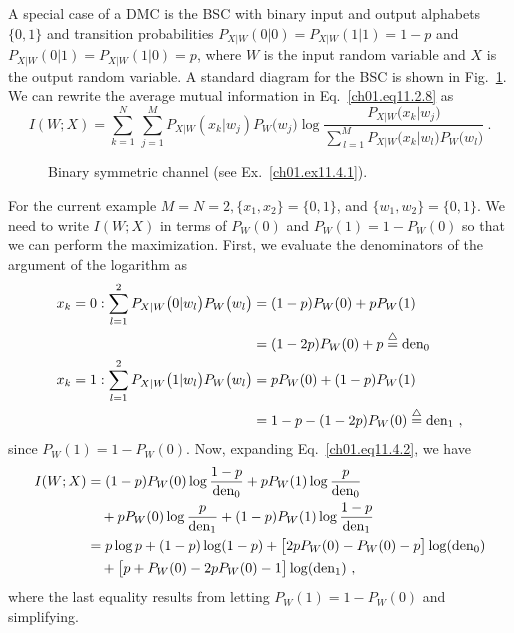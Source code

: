 \begin{example}
\label{ch01.ex11.4.1}
A special case of a DMC is the BSC with binary input and output alphabets
$\{ 0, 1 \} $ and transition probabilities
$ P_{X|W} (0|0) = P_{X|W} (1|1) = 1 -  p $
and
$ P_{X|W} (0|1) = P_{X|W} (1|0) =  p $, where $W$ is the input random variable
and
$X$ is the output random variable. A standard diagram for the BSC is shown
in Fig.~\ref{ch01.fig11.4.1}. We can rewrite the average mutual information
in Eq.~\eqref{ch01.eq11.2.8}
as
\begin{equation}
 \displaystyle
 I(W;X)  =  \sum^N_{k=1}\, \sum^M_{j=1} P_{X|W}
     \left(x_k|w_j \right) P_W \big(w_j\big)
 \log
 \frac{P_{X|W} \big(x_k|w_j\big)} {\sum\nolimits^M_{\,l=1}
  P_{X|W} \big(x_k|w_l\big) P_W \big(w_l\big) } ~.
\label{ch01.eq11.4.2}
\end{equation}

\begin{figure}[hbt] %
\figboxes
\caption{Binary symmetric channel
         (see Ex.~\protect\ref{ch01.ex11.4.1}).
\label{ch01.fig11.4.1} }
\end{figure}

For the current example $ M = N = 2,  \{ x_1, x_2 \} = \{ 0, 1 \} $, and
$ \{ w_1, w_2 \} = \{ 0, 1 \} $. We need to write $ I (W;X) $ in terms of
$ P_W (0) $ and $ P_W (1) = 1 -  P_W (0) $
so that we can perform the maximization. First, we evaluate the denominators
of the argument of the logarithm as
\begin{align*}
\displaystyle
 x_k = 0 : \sum^2_{l=1}
 P_{X|W} \big(0 | w_l\big) P_W \big(w_l\big)
 \displaystyle & = (1 - p) P_W (0) + p P_W (1)
 \\
 \displaystyle & = (1 - 2p) P_W (0)
 + p \stackrel{\triangle}{=} \text{den}_0
  \\
 x_k = 1 : \sum^2_{l=1}
 P_{X|W} \big(1 | w_l\big) P_W \big(w_l\big)
 \displaystyle & = p P_W (0) + (1 - p) P_W (1)
 \\
 \displaystyle &= 1 -p - (1- 2p) P_W (0)
 \stackrel{\triangle}{=} \text{den}_1   ~,
\end{align*}
since $P_W (1) = 1 - P_W (0) $. Now, expanding Eq.~\eqref{ch01.eq11.4.2},
we have
\begin{align}
 I(W;X) & = (1 - p) P_W (0)
 \log \frac{1-p}{\text{den}_0} + p P_W (1) \log \frac{p}{\text{den}_0}
 \notag\\
 & \quad {} +
 p P_W (0) \log \frac{p}{\text{den}_1} +
 (1 - p)
 P_W (1)
 \log \frac{ 1- p } {\text{den}_1}
 \notag\\
 & = p \log p + (1-p) \log (1 - p) + \big[2p P_W (0) - P_W (0) -p \big]
 \log (\text{den}_0)
 \notag\\
 & \quad {} + \big[p + P_W (0) - 2p P_W (0) - 1 \big]
 \log (\text{den}_1) ~,
\label{ch01.eq11.4.3}
\end{align}
where the last equality results from letting $P_W(1) = 1 - P_W (0) $
and simplifying.


\end{example}
